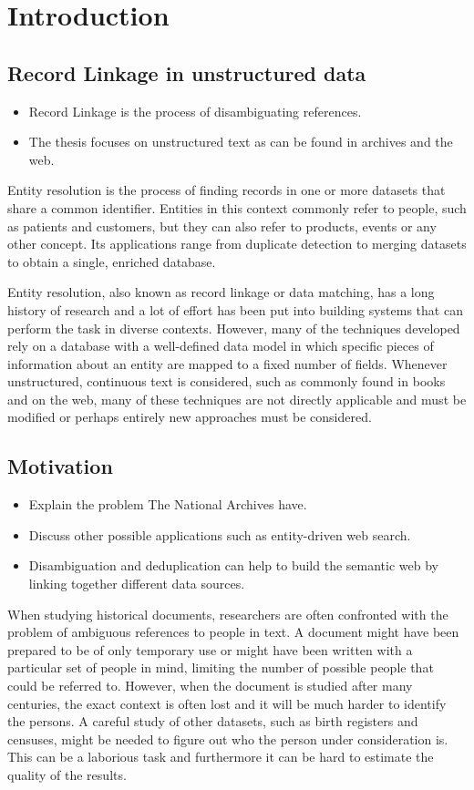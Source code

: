 \documentclass[paper=a4, fontsize=11pt]{scrartcl}					%
\numberwithin{equation}{section}					%
\numberwithin{figure}{section}						%
\numberwithin{table}{section}						%
\begin{document}
\section{Introduction}

\subsection{Record Linkage in unstructured data}
\begin{itemize}
	\item Record Linkage is the process of disambiguating references.
	\item The thesis focuses on unstructured text as can be found in archives and the web.
\end{itemize}

Entity resolution is the process of finding records in one or more datasets that share a common identifier. Entities in this context commonly refer to people, such as patients and customers, but they can also refer to products, events or any other concept. Its applications range from duplicate detection to merging datasets to obtain a single, enriched database.
	
Entity resolution, also known as record linkage or data matching, has a long history of research and a lot of effort has been put into building systems that can perform the task in diverse contexts. However, many of the techniques developed rely on a database with a well-defined data model in which specific pieces of information about an entity are mapped to a fixed number of fields. Whenever unstructured, continuous text is considered, such as commonly found in books and on the web, many of these techniques are not directly applicable and must be modified or perhaps entirely new approaches must be considered.

\subsection{Motivation}
\begin{itemize}
	\item Explain the problem The National Archives have.
	\item Discuss other possible applications such as entity-driven web search.
	\item Disambiguation and deduplication can help to build the semantic web by linking together different data sources.
\end{itemize}

When studying historical documents, researchers are often confronted with the problem of ambiguous references to people in text. A document might have been prepared to be of only temporary use or might have been written with a particular set of people in mind, limiting the number of possible people that could be referred to. However, when the document is studied after many centuries, the exact context is often lost and it will be much harder to identify the persons. A careful study of other datasets, such as birth registers and censuses, might be needed to figure out who the person under consideration is. This can be a laborious task and furthermore it can be hard to estimate the quality of the results.
\end{document}
